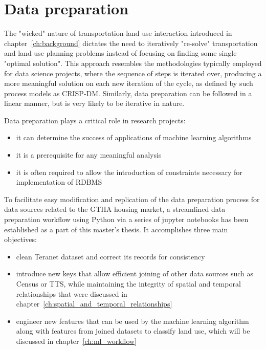 \chapter{Data preparation} \label{ch:data_preparation}

The "wicked" nature of transportation-land use interaction introduced in chapter~\ref{ch:background} dictates the need to iteratively "re-solve" transportation and land use planning problems instead of focusing on finding some single "optimal solution".
This approach resembles the methodologies typically employed for data science projects, where the sequence of steps is iterated over, producing a more meaningful solution on each new iteration of the cycle, as defined by such process models as CRISP-DM\cite{Shearer2000}.
Similarly, data preparation can be followed in a linear manner, but is very likely to be iterative in nature\cite{Brownlee2013}.

\vspace{5mm}

Data preparation plays a critical role in research projects:

\begin{itemize}
    \item it can determine the success of applications of machine learning algorithms
    \item it is a prerequisite for any meaningful analysis
    \item it is often required to allow the introduction of constraints necessary for implementation of RDBMS
\end{itemize}

\vspace{5mm}

To facilitate easy modification and replication of the data preparation process for data sources related to the GTHA housing market, a streamlined data preparation workflow using Python via a series of jupyter notebooks has been established as a part of this master's thesis.
It accomplishes three main objectives:
\begin{itemize}
    \item clean Teranet dataset and correct its records for consistency
    \item introduce new keys that allow efficient joining of other data sources such as Census or TTS, while maintaining the integrity of spatial and temporal relationships that were discussed in chapter~\ref{ch:spatial_and_temporal_relationships}
    \item engineer new features that can be used by the machine learning algorithm along with features from joined datasets to classify land use, which will be discussed in chapter~\ref{ch:ml_workflow}
\end{itemize}

